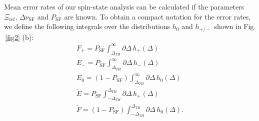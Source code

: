 \documentclass[preprint%
]{elsarticle}
\begin{document}
Mean error rates of our spin-state analysis can be calculated if the parameters $\Xi_{\mathrm{ref}}$, $\Delta\nu_{\mathrm{SF}}$ and $P_{\mathrm{SF}}$ are known.
To obtain a compact notation for the error rates, we define the following integrals over the distributions $h_0$ and $h_{+/-}$ shown in Fig.$\,$\ref{fig2} (b): 
\begin{eqnarray}
F_+ = P_{\mathrm{SF}} \int_{\Delta_{TH}}^{\infty} \partial\Delta\, h_+(\Delta)\\
E_- = P_{\mathrm{SF}} \int_{\Delta_{TH}}^{\infty} \partial\Delta\, h_-(\Delta)\\
E_0 = (1-P_{\mathrm{SF}}) \int_{\Delta_{TH}}^{\infty} \partial\Delta\, h_0(\Delta)\\
\tilde{E}=P_{\mathrm{SF}} \int_{-\Delta_{TH}}^{\Delta_{TH}} \partial\Delta\, h_+(\Delta)\\
\tilde{F}=(1-P_{\mathrm{SF}}) \int_{-\Delta_{TH}}^{\Delta_{TH}} \partial\Delta\, h_0(\Delta).
\end{eqnarray}
\end{document}
